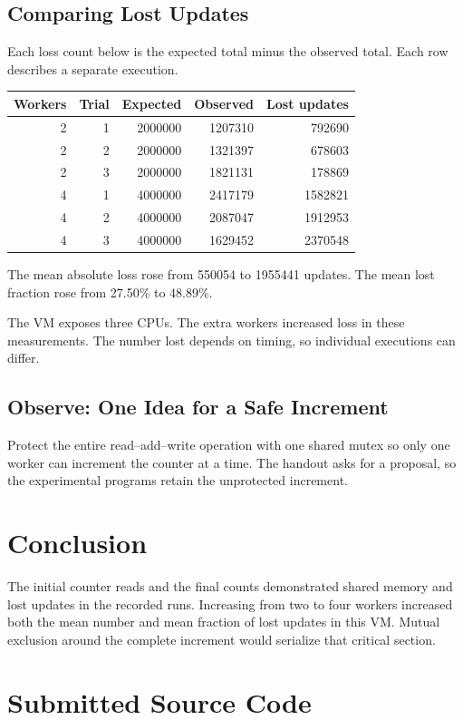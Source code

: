 \documentclass[12pt,a4paper]{article}
\begin{document}
\subsection{Comparing Lost Updates}
Each loss count below is the expected total minus the observed total. Each row
describes a separate execution.
\begin{center}
\begin{tabular}{rrrrr}
\toprule
Workers & Trial & Expected & Observed & Lost updates\\
\midrule
2 & 1 & 2000000 & 1207310 & 792690\\
2 & 2 & 2000000 & 1321397 & 678603\\
2 & 3 & 2000000 & 1821131 & 178869\\
4 & 1 & 4000000 & 2417179 & 1582821\\
4 & 2 & 4000000 & 2087047 & 1912953\\
4 & 3 & 4000000 & 1629452 & 2370548\\
\bottomrule
\end{tabular}
\end{center}
The mean absolute loss rose from 550054 to 1955441 updates. The mean lost fraction rose from 27.50\% to 48.89\%.

The VM exposes three CPUs. The extra workers increased loss in these measurements.
The number lost depends on timing, so individual executions can differ.

\subsection{Observe: One Idea for a Safe Increment}
Protect the entire read--add--write operation with one shared mutex so only one
worker can increment the counter at a time. The handout asks for a proposal,
so the experimental programs retain the unprotected increment.

\section{Conclusion}
The initial counter reads and the final counts demonstrated shared memory and
lost updates in the recorded runs. Increasing from two to four workers increased
both the mean number and mean fraction of lost updates in this VM. Mutual
exclusion around the complete increment would serialize that critical section.

\appendix
\section{Submitted Source Code}
\end{document}
